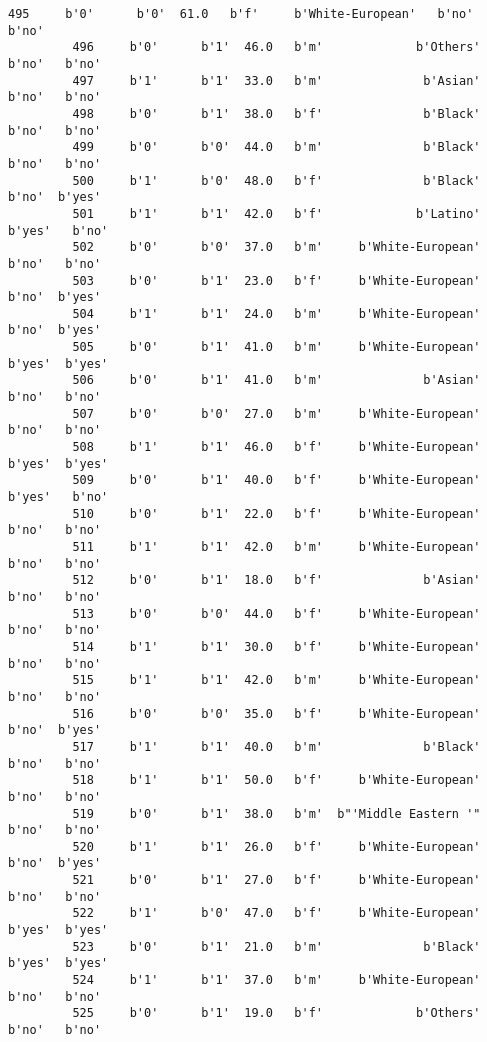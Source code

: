\documentclass[11pt]{article}
\begin{document}
\begin{Verbatim}[commandchars=\\\{\}]
         495     b'0'      b'0'  61.0   b'f'     b'White-European'   b'no'   b'no'   
         496     b'0'      b'1'  46.0   b'm'             b'Others'   b'no'   b'no'   
         497     b'1'      b'1'  33.0   b'm'              b'Asian'   b'no'   b'no'   
         498     b'0'      b'1'  38.0   b'f'              b'Black'   b'no'   b'no'   
         499     b'0'      b'0'  44.0   b'm'              b'Black'   b'no'   b'no'   
         500     b'1'      b'0'  48.0   b'f'              b'Black'   b'no'  b'yes'   
         501     b'1'      b'1'  42.0   b'f'             b'Latino'  b'yes'   b'no'   
         502     b'0'      b'0'  37.0   b'm'     b'White-European'   b'no'   b'no'   
         503     b'0'      b'1'  23.0   b'f'     b'White-European'   b'no'  b'yes'   
         504     b'1'      b'1'  24.0   b'm'     b'White-European'   b'no'  b'yes'   
         505     b'0'      b'1'  41.0   b'm'     b'White-European'  b'yes'  b'yes'   
         506     b'0'      b'1'  41.0   b'm'              b'Asian'   b'no'   b'no'   
         507     b'0'      b'0'  27.0   b'm'     b'White-European'   b'no'   b'no'   
         508     b'1'      b'1'  46.0   b'f'     b'White-European'  b'yes'  b'yes'   
         509     b'0'      b'1'  40.0   b'f'     b'White-European'  b'yes'   b'no'   
         510     b'0'      b'1'  22.0   b'f'     b'White-European'   b'no'   b'no'   
         511     b'1'      b'1'  42.0   b'm'     b'White-European'   b'no'   b'no'   
         512     b'0'      b'1'  18.0   b'f'              b'Asian'   b'no'   b'no'   
         513     b'0'      b'0'  44.0   b'f'     b'White-European'   b'no'   b'no'   
         514     b'1'      b'1'  30.0   b'f'     b'White-European'   b'no'   b'no'   
         515     b'1'      b'1'  42.0   b'm'     b'White-European'   b'no'   b'no'   
         516     b'0'      b'0'  35.0   b'f'     b'White-European'   b'no'  b'yes'   
         517     b'1'      b'1'  40.0   b'm'              b'Black'   b'no'   b'no'   
         518     b'1'      b'1'  50.0   b'f'     b'White-European'   b'no'   b'no'   
         519     b'0'      b'1'  38.0   b'm'  b"'Middle Eastern '"   b'no'   b'no'   
         520     b'1'      b'1'  26.0   b'f'     b'White-European'   b'no'  b'yes'   
         521     b'0'      b'1'  27.0   b'f'     b'White-European'   b'no'   b'no'   
         522     b'1'      b'0'  47.0   b'f'     b'White-European'  b'yes'  b'yes'   
         523     b'0'      b'1'  21.0   b'm'              b'Black'  b'yes'  b'yes'   
         524     b'1'      b'1'  37.0   b'm'     b'White-European'   b'no'   b'no'   
         525     b'0'      b'1'  19.0   b'f'             b'Others'   b'no'   b'no'   

\end{Verbatim}
\end{document}
